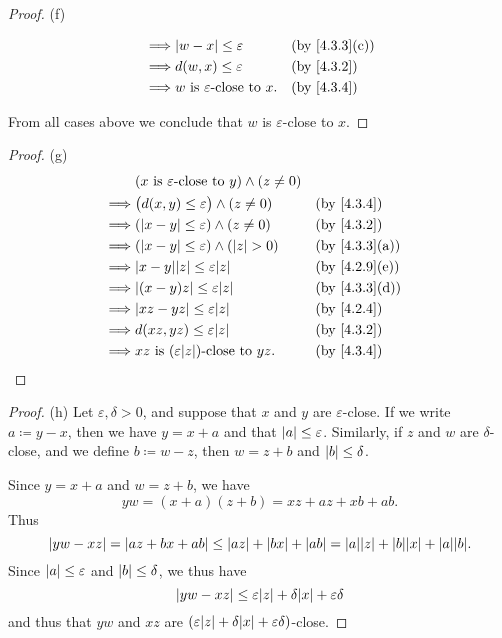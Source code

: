 \begin{proof}{(f)}
\begin{itemize}
\begin{align*}
			      \implies & \abs{w - x} \leq \varepsilon                                   &  & \text{(by \cref{4.3.3}(c))} \\
			      \implies & d(w, x) \leq \varepsilon                                       &  & \by{4.3.2}                  \\
			      \implies & w \text{ is } \varepsilon\text{-close to } x.                  &  & \by{4.3.4}
		      \end{align*}
	\end{itemize}
	From all cases above we conclude that \(w\) is \(\varepsilon\)-close to \(x\).
\end{proof}

\begin{proof}{(g)}
	\begin{align*}
		         & (x \text{ is } \varepsilon\text{-close to } y) \land (z \neq 0)                                  \\
		\implies & \big(d(x, y) \leq \varepsilon\big) \land (z \neq 0)             &  & \by{4.3.4}                  \\
		\implies & (\abs{x - y} \leq \varepsilon) \land (z \neq 0)                 &  & \by{4.3.2}                  \\
		\implies & (\abs{x - y} \leq \varepsilon) \land (\abs{z} > 0)              &  & \text{(by \cref{4.3.3}(a))} \\
		\implies & \abs{x - y} \abs{z} \leq \varepsilon \abs{z}                    &  & \text{(by \cref{4.2.9}(e))} \\
		\implies & \abs{(x - y)z} \leq \varepsilon \abs{z}                         &  & \text{(by \cref{4.3.3}(d))} \\
		\implies & \abs{xz - yz} \leq \varepsilon \abs{z}                          &  & \by{4.2.4}                  \\
		\implies & d(xz, yz) \leq \varepsilon \abs{z}                              &  & \by{4.3.2}                  \\
		\implies & xz \text{ is } (\varepsilon \abs{z})\text{-close to } yz.       &  & \by{4.3.4}
	\end{align*}
\end{proof}

\begin{proof}{(h)}
	Let \(\varepsilon, \delta > 0\), and suppose that \(x\) and \(y\) are \(\varepsilon\)-close.
	If we write \(a \coloneqq y - x\), then we have \(y = x + a\) and that \(\left\lvert a\right\rvert \leq \varepsilon\).
	Similarly, if \(z\) and \(w\) are \(\delta\)-close, and we define \(b \coloneqq w - z\), then \(w = z + b\) and \(\left\lvert b\right\rvert \leq \delta\).

	Since \(y = x + a\) and \(w = z + b\), we have
	\[
		yw = (x + a)(z + b) = xz + az + xb + ab.
	\]
	Thus
	\[
		\abs{yw - xz} = \abs{az + bx + ab} \leq \abs{az} + \abs{bx} + \abs{ab} = \abs{a}\abs{z} + \abs{b}\abs{x} + \abs{a}\abs{b}.
	\]
	Since \(\left\lvert a\right\rvert \leq \varepsilon\) and \(\left\lvert b\right\rvert \leq \delta\), we thus have
	\[
		\abs{yw - xz} \leq \varepsilon\abs{z} + \delta\abs{x} + \varepsilon\delta
	\]
	and thus that \(yw\) and \(xz\) are \((\varepsilon\abs{z} + \delta\abs{x} + \varepsilon\delta)\)-close.
\end{proof}

